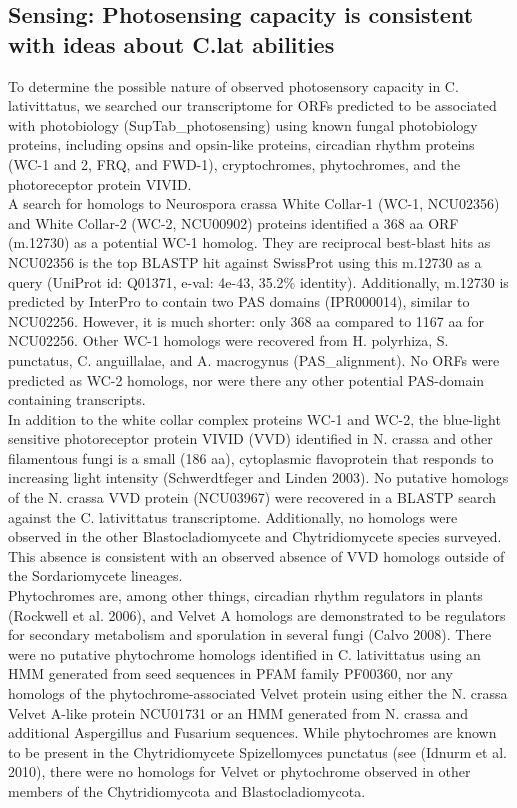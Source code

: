 \subsection{Sensing: Photosensing capacity is consistent with ideas about C.lat abilities}
To determine the possible nature of observed photosensory capacity in C. lativittatus, we searched our transcriptome for ORFs predicted to be associated with photobiology (SupTab\_photosensing) using known fungal photobiology proteins, including opsins and opsin-like proteins, circadian rhythm proteins (WC-1 and 2, FRQ, and FWD-1), cryptochromes, phytochromes, and the photoreceptor protein VIVID. \\
\indent A search for homologs to Neurospora crassa White Collar-1 (WC-1, NCU02356) and White Collar-2 (WC-2, NCU00902) proteins identified a 368 aa ORF (m.12730) as a potential WC-1 homolog. They are reciprocal best-blast hits as NCU02356 is the top BLASTP hit against SwissProt using this m.12730 as a query (UniProt id: Q01371, e-val: 4e-43, 35.2\% identity). Additionally, m.12730 is predicted by InterPro to contain two PAS domains (IPR000014), similar to NCU02256. However, it is much shorter: only 368 aa compared to 1167 aa for NCU02256. Other WC-1 homologs were recovered from H. polyrhiza, S. punctatus, C. anguillalae, and A. macrogynus (PAS\_alignment). No ORFs were predicted as WC-2 homologs, nor were there any other potential PAS-domain containing transcripts. \\
\indent In addition to the white collar complex proteins WC-1 and WC-2, the blue-light sensitive photoreceptor protein VIVID (VVD) identified in N. crassa and other filamentous fungi is a small (186 aa), cytoplasmic flavoprotein that responds to increasing light intensity (Schwerdtfeger and Linden 2003). No putative homologs of the N. crassa VVD protein (NCU03967) were recovered in a BLASTP search against the C. lativittatus transcriptome. Additionally, no homologs were observed in the other Blastocladiomycete and Chytridiomycete species surveyed. This absence is consistent with an observed absence of VVD homologs outside of the Sordariomycete lineages. \\
\indent Phytochromes are, among other things, circadian rhythm regulators in plants (Rockwell et al. 2006), and Velvet A homologs are demonstrated to be regulators for secondary metabolism and sporulation in several fungi (Calvo 2008). There were no putative phytochrome homologs identified in C. lativittatus using an HMM generated from seed sequences in PFAM family PF00360, nor any homologs of the phytochrome-associated Velvet protein using either the N. crassa Velvet A-like protein NCU01731 or an HMM generated from N. crassa and additional Aspergillus and Fusarium sequences. While phytochromes are known to be present in the Chytridiomycete Spizellomyces punctatus (see (Idnurm et al. 2010), there were no homologs for Velvet or phytochrome observed in other members of the Chytridiomycota and Blastocladiomycota. \\
